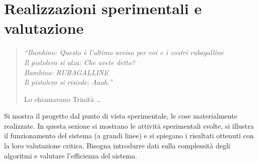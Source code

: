 \chapter{Realizzazioni sperimentali e valutazione}
\label{capitolo6}
\thispagestyle{empty}

\begin{quotation}
{\footnotesize
\noindent\emph{``Bambino: Questo è l'ultimo avviso per voi e i vostri rubagalline \\
Il pistolero si alza: Che avete detto? \\
Bambino: RUBAGALLINE \\
Il pistolero si risiede: Aaah.''}
\begin{flushright}
Lo chiamavano Trinit\`a \dots
\end{flushright}
}
\end{quotation}
\vspace{0.5cm}

\noindent Si mostra il progetto dal punto di vista sperimentale, le cose materialmente realizzate. In questa sezione si mostrano le attivit\`a sperimentali svolte, si illustra il funzionamento del sistema (a grandi linee) e si spiegano i risultati ottenuti con la loro valutazione critica. Bisogna introdurre dati sulla complessit\`a degli algoritmi e valutare l'efficienza del sistema.